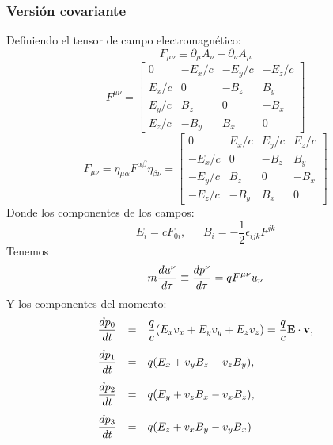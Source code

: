 \documentclass[]{article}
\numberwithin{equation}{section}
\begin{document}
\subsubsection{Versión covariante}
Definiendo el tensor de campo electromagnético:
\begin{equation}
	F_{\mu\nu} \equiv \partial_\mu A_\nu - \partial_\nu A_\mu
\end{equation}
\begin{equation}
	F^{\mu\nu} = \begin{bmatrix}
		0 		& -E_x/c 	& -E_y/c 	& -E_z/c \\
		E_x/c 	& 0			& -B_z 		& B_y	\\
		E_y/c 	& B_z		& 0 		& -B_x	\\
		E_z/c 	& -B_y 		& B_x 		& 0
	\end{bmatrix}
\end{equation}
\begin{equation}
	F_{\mu\nu} = \eta_{\mu\alpha} F^{\alpha\beta} \eta_{\beta\nu} = \begin{bmatrix}
	0 		& E_x/c 	& E_y/c 	& E_z/c \\
	-E_x/c 	& 0			& -B_z 		& B_y	\\
	-E_y/c 	& B_z		& 0 		& -B_x	\\
	-E_z/c 	& -B_y 		& B_x 		& 0
	\end{bmatrix}
\end{equation}
Donde los componentes de los campos:
\begin{equation*}
	E_{i} = c F_{0i}, ~~~~~~~ B_{i} = -\frac{1}{2} \epsilon_{ijk} F^{jk}
\end{equation*}
Tenemos
\begin{equation}
	m \dfrac{d u^{\nu}}{d \tau} \equiv \dfrac{d p^\nu}{d \tau} = q F^{\mu\nu} u_{\nu}
\end{equation}
Y los componentes del momento:
\begin{equation}
	\begin{matrix}
		\td{p_0}{t} &=& \dfrac{q}{c} (E_x v_x + E_y v_y + E_z v_z) = \dfrac{q}{c}\n{E}\cdot\n{v},\vspace{3mm}\\
		\td{p_1}{t} &=& q (E_x + v_y B_z - v_z B_y),\hfill\vspace{3mm}\\
		\td{p_2}{t} &=& q (E_y + v_z B_x - v_x B_z),\hfill\vspace{3mm}\\
		\td{p_3}{t} &=& q (E_z + v_x B_y - v_y B_x)\hfill
	\end{matrix}
\end{equation}
\end{document}
